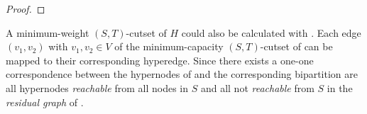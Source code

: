 \begin{proof}
%
\end{proof} 

A minimum-weight $(S,T)$-cutset of $H$ could also be calculated with . 
Each edge $(v_1,v_2)$ with $v_1,v_2 \in V$ of the minimum-capacity
$(S,T)$-cutset of  can be mapped to their corresponding hyperedge. 
Since there exists a one-one correspondence between the hypernodes
of  and  the corresponding bipartition are all hypernodes \emph{reachable}
from all nodes in $S$ and all not \emph{reachable} from $S$ in the \emph{residual graph}
of . 

